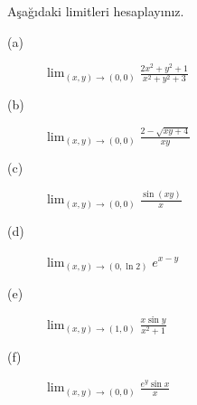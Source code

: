 \begin{soru}
Aşağıdaki limitleri hesaplayınız.
\begin{description}
  \item[(a)] $\displaystyle\lim_{(x,y)\to(0,0)}\frac{2x^2+y^2+1}{x^2+y^2+3}$
  \item[(b)] $\displaystyle\lim_{(x,y)\to(0,0)}\frac{2-\sqrt{xy+4}}{xy}$
  \item[(c)] $\displaystyle\lim_{(x,y)\to(0,0)}\frac{\sin(xy)}{x}$
  \item[(d)] $\displaystyle\lim_{(x,y)\to(0,\ln 2)}e^{x-y}$
  \item[(e)] $\displaystyle\lim_{(x,y)\to(1,0)}\frac{x\sin y}{x^2+1}$
  \item[(f)] $\displaystyle\lim_{(x,y)\to(0,0)}\frac{e^y\sin x}{x}$
\end{description}
\end{soru}
